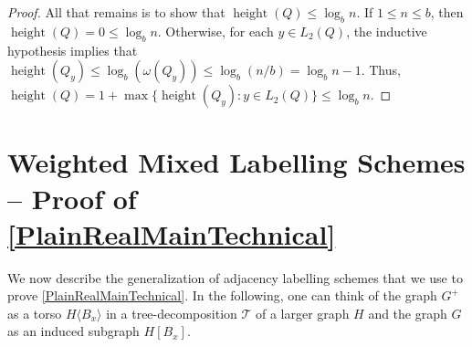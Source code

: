 \documentclass{patmorin}
\renewcommand{\le}{\leqslant}
\newcommand{\torso}[2]{{#1}\langle{#2}\rangle}
\DeclareMathOperator{\height}{height}
\newcommand{\calQ}{\mathcal{Q}}
\newcommand{\calT}{\mathcal{T}}
\begin{document}
\begin{proof}


    All that remains is to show that $\height(Q)\le\log_b n$.  If $1\le n \le b$, then $\height(Q)=0\le\log_b n$.  Otherwise, for each $y\in L_2(Q)$, the inductive hypothesis implies that $\height(Q_y)\le\log_b(\omega(Q_y))\le\log_b(n/b)=\log_b n - 1$.  Thus, $\height(Q)=1+\max\{\height(Q_y):y\in L_2(Q)\}\le \log_b n$.
  \end{proof}



  \section{Weighted Mixed Labelling Schemes -- Proof of \cref{PlainRealMainTechnical}}
  \label{weighted_mixed_section}

We now describe the generalization of adjacency labelling schemes that we use to prove \cref{PlainRealMainTechnical}.  In the following, one can think of the graph $G^+$ as a torso $\torso{H}{B_x}$ in a tree-decomposition $\calT$ of a larger graph $H$ and the graph $G$ as an induced subgraph $H[B_x]$.
\end{document}
